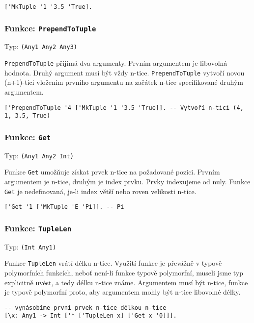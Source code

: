 \begin{lstlisting}[caption={Ukázka využití OneTuple}]
['MkTuple '1 '3.5 'True].
\end{lstlisting}

\subsubsection*{Funkce: \lstinline{PrependToTuple}}
Typ: \lstinline{(Any1 Any2 Any3)}

\lstinline{PrependToTuple} přijímá dva argumenty. Prvním argumentem je libovolná hodnota. Druhý
argument musí být vždy n-tice. \lstinline{PrependToTuple} vytvoří novou (n+1)-tici vložením prvního
argumentu na začátek n-tice specifikované druhým argumentem.

\begin{lstlisting}[caption={Ukázka využití PrependToTuple}]
['PrependToTuple '4 ['MkTuple '1 '3.5 'True]]. -- Vytvoří n-tici (4, 1, 3.5, True)
\end{lstlisting}

\subsubsection*{Funkce: \lstinline{Get}}
Typ: \lstinline{(Any1 Any2 Int)}

Funkce \lstinline{Get} umožňuje získat prvek n-tice na požadované pozici. Prvním argumentem je
n-tice, druhým je index prvku. Prvky indexujeme od nuly. Funkce \lstinline{Get} je nedefinovaná,
je-li index větší nebo roven velikosti n-tice.

\begin{lstlisting}[caption={Ukázka využití Get}]
['Get '1 ['MkTuple 'E 'Pi]]. -- Pi
\end{lstlisting}

\subsubsection*{Funkce: \lstinline{TupleLen}}
Typ: \lstinline{(Int Any1)}

Funkce \lstinline{TupleLen} vrátí délku n-tice. Využití funkce je převážně v typově polymorfních
funkcích, neboť není-li funkce typově polymorfní, museli jsme typ explicitně uvést, a tedy délku
n-tice známe. Argumentem musí být n-tice, funkce je typově polymorfní proto, aby argumentem mohly
být n-tice libovolné délky.

\begin{lstlisting}[caption={Ukázka využití TupleLen}]
-- vynásobíme první prvek n-tice délkou n-tice
[\x: Any1 -> Int ['* ['TupleLen x] ['Get x '0]]].
\end{lstlisting}

